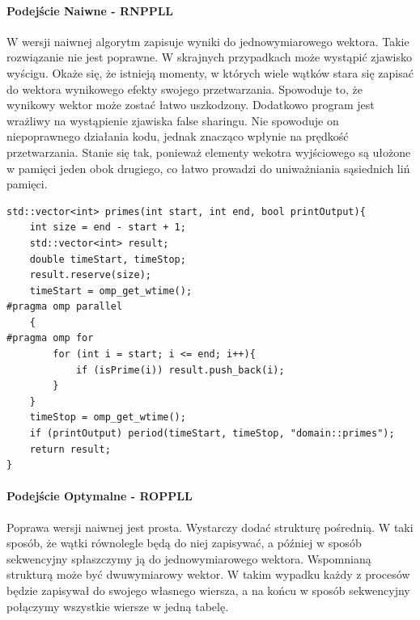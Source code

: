 \documentclass{article}
\begin{document}
                \paragraph{Podejście Naiwne - \gls{RNPPLL}}
                    W wersji naiwnej algorytm zapisuje wyniki do jednowymiarowego wektora. Takie rozwiązanie nie jest poprawne. W skrajnych przypadkach może wystąpić zjawisko wyścigu. Okaże się, że istnieją momenty, w których wiele wątków stara się zapisać do wektora wynikowego efekty swojego przetwarzania. Spowoduje to, że wynikowy wektor może zostać łatwo uszkodzony. Dodatkowo program jest wrażliwy na wystąpienie zjawiska false sharingu. Nie spowoduje on niepoprawnego działania kodu, jednak znacząco wpłynie na prędkość przetwarzania. Stanie się tak, ponieważ elementy wekotra wyjściowego są ułożone w pamięci jeden obok drugiego, co łatwo prowadzi do uniważniania sąsiednich liń pamięci. 
                    \begin{verbatim}
std::vector<int> primes(int start, int end, bool printOutput){
    int size = end - start + 1;
    std::vector<int> result;
    double timeStart, timeStop;
    result.reserve(size);
    timeStart = omp_get_wtime();
#pragma omp parallel
    {
#pragma omp for
        for (int i = start; i <= end; i++){
            if (isPrime(i)) result.push_back(i);
        }
    }
    timeStop = omp_get_wtime();
    if (printOutput) period(timeStart, timeStop, "domain::primes");
    return result;
}
                    \end{verbatim}
                
                \paragraph{Podejście Optymalne - \gls{ROPPLL}}
                    Poprawa wersji naiwnej jest prosta. Wystarczy dodać strukturę pośrednią. W taki sposób, że wątki równolegle będą do niej zapisywać, a później w sposób sekwencyjny spłaszczymy ją do jednowymiarowego wektora. Wspomnianą strukturą może być dwuwymiarowy wektor. W takim wypadku każdy z procesów będzie zapisywał do swojego własnego wiersza, a na końcu w sposób sekwencyjny połączymy wszystkie wiersze w jedną tabelę.
                    
\end{document}
